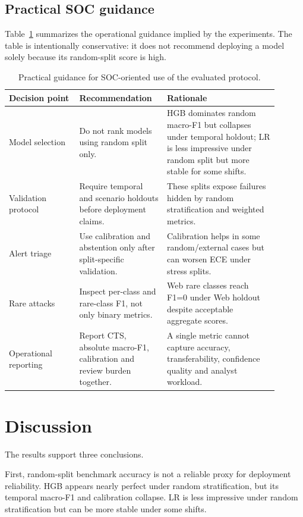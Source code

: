 \documentclass[11pt,a4paper]{article}
\begin{document}
\subsection{Practical SOC guidance}

Table~\ref{tab:soc-guidance} summarizes the operational guidance implied by the experiments. The table is intentionally conservative: it does not recommend deploying a model solely because its random-split score is high.

\begin{table}[ht]
\centering
\small
\caption{Practical guidance for SOC-oriented use of the evaluated protocol.}
\label{tab:soc-guidance}
\begin{tabular}{
>{\raggedright\arraybackslash}p{0.24\linewidth}
>{\raggedright\arraybackslash}p{0.28\linewidth}
>{\raggedright\arraybackslash}p{0.38\linewidth}}
\toprule
Decision point & Recommendation & Rationale \\
\midrule
Model selection & Do not rank models using random split only. & HGB dominates random macro-F1 but collapses under temporal holdout; LR is less impressive under random split but more stable for some shifts. \\
Validation protocol & Require temporal and scenario holdouts before deployment claims. & These splits expose failures hidden by random stratification and weighted metrics. \\
Alert triage & Use calibration and abstention only after split-specific validation. & Calibration helps in some random/external cases but can worsen ECE under stress splits. \\
Rare attacks & Inspect per-class and rare-class F1, not only binary metrics. & Web rare classes reach F1=0 under Web holdout despite acceptable aggregate scores. \\
Operational reporting & Report CTS, absolute macro-F1, calibration and review burden together. & A single metric cannot capture accuracy, transferability, confidence quality and analyst workload. \\
\bottomrule
\end{tabular}
\end{table}

\section{Discussion}

The results support three conclusions.

First, random-split benchmark accuracy is not a reliable proxy for deployment reliability. HGB appears nearly perfect under random stratification, but its temporal macro-F1 and calibration collapse. LR is less impressive under random stratification but can be more stable under some shifts.
\end{document}

